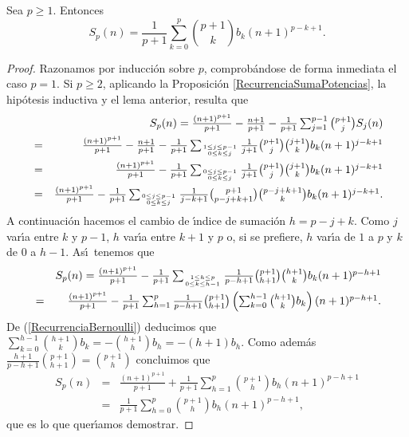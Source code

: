 \begin{theorem} Sea $p\geq 1$. Entonces
\begin{equation}\label{FormulaSumaPotencias} S_p(n)=\frac{1}{p+1}\sum_{k=0}^p{p+1\choose k}b_k(n+1)^{p-k+1}.\end{equation}
\end{theorem}

\begin{proof}
Razonamos por inducci\'on sobre $p$, comprob\'andose de forma inmediata el caso $p=1$. Si $p\geq 2$, aplicando la Proposici\'on \ref{RecurrenciaSumaPotencias}, la hip\'otesis inductiva y el lema anterior, resulta que
\begin{eqnarray*}
&&\textstyle S_p(n)=\frac{(n+1)^{p+1}}{p+1}-\frac{n+1}{p+1}-\frac{1}{p+1}\sum_{j=1}^{p-1}{p+1\choose j}S_j(n)\\
&=&\textstyle \frac{(n+1)^{p+1}}{p+1}-\frac{n+1}{p+1}-\frac{1}{p+1}\sum_{1\leq j\leq p-1\atop 0\leq k\leq j}\frac{1}{j+1}{p+1\choose j}{j+1\choose k}b_k(n+1)^{j-k+1}\\
&=&\textstyle \frac{(n+1)^{p+1}}{p+1}-\frac{1}{p+1}\sum_{0\leq j\leq p-1\atop 0\leq k\leq j}\frac{1}{j+1}{p+1\choose j}{j+1\choose k}b_k(n+1)^{j-k+1}\\
&=&\textstyle \frac{(n+1)^{p+1}}{p+1}-\frac{1}{p+1}\sum_{0\leq j\leq p-1\atop 0\leq k\leq j}\frac{1}{j-k+1}{p+1\choose p-j+k+1}{p-j+k+1\choose k}b_k(n+1)^{j-k+1}.
\end{eqnarray*}
A continuaci\'on hacemos el cambio de \'\i ndice de sumaci\'on $h=p-j+k$. Como $j$ var\'\i a entre $k$ y $p-1$, $h$ var\'\i a entre $k+1$ y $p$ o, si se prefiere, $h$ var\'\i a de $1$ a $p$ y $k$ de $0$ a $h-1$. As\'\i\ tenemos que
\begin{eqnarray*}
&&\textstyle S_p(n)=\frac{(n+1)^{p+1}}{p+1}-\frac{1}{p+1}\sum_{1\leq h\leq p\atop 0\leq k\leq h-1}\frac{1}{p-h+1}{p+1\choose h+1}{h+1\choose k}b_k(n+1)^{p-h+1}\\
&=&\textstyle  \frac{(n+1)^{p+1}}{p+1}-\frac{1}{p+1}\sum_{h=1}^p\frac{1}{p-h+1}{p+1\choose h+1}\left(\sum_{k=0}^{h-1}{h+1\choose k}b_k\right) (n+1)^{p-h+1}.
\end{eqnarray*}
De (\ref{RecurrenciaBernoulli}) deducimos que $\sum_{k=0}^{h-1}{h+1\choose k}b_k=-{h+1\choose h}b_h=-(h+1)b_h$. Como adem\'as $\frac{h+1}{p-h+1}{p+1\choose h+1}={p+1\choose h}$ concluimos que
\begin{eqnarray*}S_p(n)&=& \frac{(n+1)^{p+1}}{p+1}+\frac{1}{p+1}\sum_{h=1}^p{p+1\choose h}b_h(n+1)^{p-h+1}\\&=&
\frac{1}{p+1}\sum_{h=0}^p{p+1\choose h}b_h(n+1)^{p-h+1},\end{eqnarray*}
que es lo que quer\'\i amos demostrar.
\end{proof}

